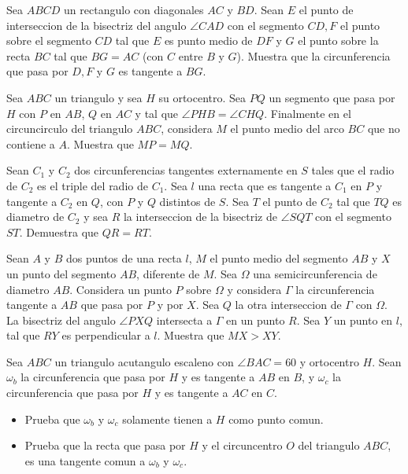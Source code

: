 \documentclass[11pt]{scrartcl}
\begin{document}
\begin{problem}
[2014/4] Sea $ABCD$ un rectangulo con diagonales $AC$ y $BD$. Sean $E$ el punto de interseccion de la bisectriz del angulo $\angle{CAD}$ con el segmento $CD, F$ el punto sobre el segmento $CD$ tal que $E$ es punto medio de $DF$ y $G$ el punto sobre la recta $BC$ tal que $BG=AC$ (con $C$ entre $B$ y $G$). Muestra que la circunferencia que pasa por $D,F$ y $G$ es tangente a $BG$.
\end{problem}

\begin{problem}
[2015/1] Sea $ABC$ un triangulo y sea $H$ su ortocentro. Sea $PQ$ un segmento que pasa por $H$ con $P$ en $AB$, $Q$ en $AC$ y tal que $\angle{PHB}=\angle{CHQ}$. Finalmente en el circuncirculo del triangulo $ABC$, considera $M$ el punto medio del arco $BC$ que no contiene a $A$. Muestra que $MP=MQ$.
\end{problem}

\begin{problem}
[2016/1] Sean $C_1$ y $C_2$ dos circunferencias tangentes externamente en $S$ tales que el radio de $C_2$ es el triple del radio de $C_1$. Sea $l$ una recta que es tangente a $C_1$ en $P$ y tangente a $C_2$ en $Q$, con $P$ y $Q$ distintos de $S$. Sea $T$ el punto de $C_2$ tal que $TQ$ es diametro de $C_2$ y sea $R$ la interseccion de la bisectriz de $\angle{SQT}$ con el segmento $ST$. Demuestra que $QR=RT$.
\end{problem}

\begin{problem}
[2018/1] Sean $A$ y $B$ dos puntos de una recta $l$, $M$ el punto medio del segmento $AB$ y $X$ un punto del segmento $AB$, diferente de $M$. Sea $\Omega$ una semicircunferencia de diametro $AB$. Considera un punto $P$ sobre $\Omega$ y considera $\Gamma$ la circunferencia tangente a $AB$ que pasa por $P$ y por $X$. Sea $Q$ la otra interseccion de $\Gamma$ con $\Omega$. La bisectriz del angulo $\angle{PXQ}$ intersecta a $\Gamma$ en un punto $R$. Sea $Y$ un punto en $l$, tal que $RY$ es perpendicular a $l$. Muestra que $MX>XY$.
\end{problem}
\begin{problem}
[2021/4] Sea $ABC$ un triangulo acutangulo escaleno con $\angle{BAC}=60$ y ortocentro $H$. Sean $\omega_b$ la circunferencia que pasa por $H$ y es tangente a $AB$ en $B$,  y $\omega_c$ la circunferencia que pasa por $H$ y es tangente a $AC$ en $C$. 
\begin{itemize}
\item Prueba que $\omega_b$ y $\omega_c$ solamente tienen a $H$ como punto comun.
\item Prueba que la recta que pasa por $H$ y el circuncentro $O$ del triangulo $ABC$, es una tangente comun a $\omega_b$ y $\omega_c$.
\end{itemize}
\end{problem}
\end{document}
